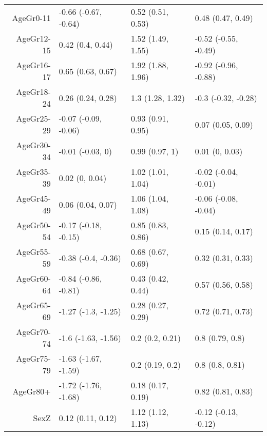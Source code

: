 \begin{table}[ht]
\begin{tabular}{rlll}
  AgeGr0-11 & -0.66 (-0.67, -0.64) & 0.52 (0.51, 0.53) & 0.48 (0.47, 0.49) \\ 
  AgeGr12-15 & 0.42 (0.4, 0.44) & 1.52 (1.49, 1.55) & -0.52 (-0.55, -0.49) \\ 
  AgeGr16-17 & 0.65 (0.63, 0.67) & 1.92 (1.88, 1.96) & -0.92 (-0.96, -0.88) \\ 
  AgeGr18-24 & 0.26 (0.24, 0.28) & 1.3 (1.28, 1.32) & -0.3 (-0.32, -0.28) \\ 
  AgeGr25-29 & -0.07 (-0.09, -0.06) & 0.93 (0.91, 0.95) & 0.07 (0.05, 0.09) \\ 
  AgeGr30-34 & -0.01 (-0.03, 0) & 0.99 (0.97, 1) & 0.01 (0, 0.03) \\ 
  AgeGr35-39 & 0.02 (0, 0.04) & 1.02 (1.01, 1.04) & -0.02 (-0.04, -0.01) \\ 
  AgeGr45-49 & 0.06 (0.04, 0.07) & 1.06 (1.04, 1.08) & -0.06 (-0.08, -0.04) \\ 
  AgeGr50-54 & -0.17 (-0.18, -0.15) & 0.85 (0.83, 0.86) & 0.15 (0.14, 0.17) \\ 
  AgeGr55-59 & -0.38 (-0.4, -0.36) & 0.68 (0.67, 0.69) & 0.32 (0.31, 0.33) \\ 
  AgeGr60-64 & -0.84 (-0.86, -0.81) & 0.43 (0.42, 0.44) & 0.57 (0.56, 0.58) \\ 
  AgeGr65-69 & -1.27 (-1.3, -1.25) & 0.28 (0.27, 0.29) & 0.72 (0.71, 0.73) \\ 
  AgeGr70-74 & -1.6 (-1.63, -1.56) & 0.2 (0.2, 0.21) & 0.8 (0.79, 0.8) \\ 
  AgeGr75-79 & -1.63 (-1.67, -1.59) & 0.2 (0.19, 0.2) & 0.8 (0.8, 0.81) \\ 
  AgeGr80+ & -1.72 (-1.76, -1.68) & 0.18 (0.17, 0.19) & 0.82 (0.81, 0.83) \\ 
  SexZ & 0.12 (0.11, 0.12) & 1.12 (1.12, 1.13) & -0.12 (-0.13, -0.12) \\ 
   \hline
\end{tabular}
\end{table}

